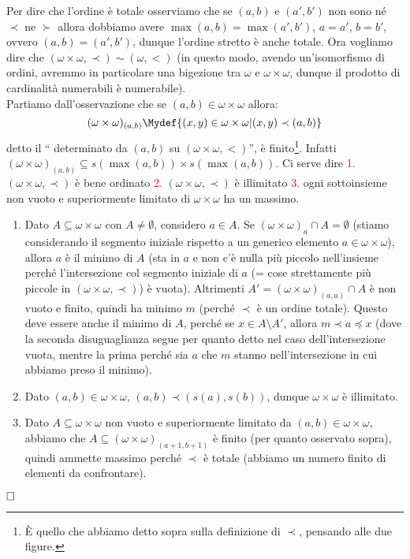 \documentclass[11pt]{scrartcl}
\begin{document}
	Per dire che l'ordine è totale osserviamo che se $(a,b)$ e $(a',b')$ non sono né $\prec$ ne $\succ$ allora dobbiamo avere $\max(a,b) = \max(a',b')$, $a = a'$, $b = b'$, ovvero $(a,b) = (a',b')$, dunque l'ordine stretto è anche totale.
	Ora vogliamo dire che $(\omega \times \omega, \prec) \sim (\omega, <)$ (in questo modo, avendo un'isomorfismo di ordini, avremmo in particolare una bigezione tra $\omega$ e $\omega \times \omega$, dunque il prodotto di cardinalità numerabili è numerabile).\\
	Partiamo dall'osservazione che se $(a,b) \in \omega \times \omega$ allora:
	\[ (\omega \times \omega)_{(a,b)} \Mydef \{(x,y) \in \omega \times \omega | (x,y) \prec (a,b)\}
		\]
	detto il `` determinato da $(a,b)$ su $(\omega \times \omega,<)$'', è finito\footnote{È quello che abbiamo detto sopra sulla definizione di $\prec$, pensando alle due figure.}. Infatti $(\omega \times \omega)_{(a,b)} \subseteq s(\max(a,b)) \times s(\max(a,b))$.
	Ci serve dire \textcolor{red}{1.} $(\omega \times \omega, \prec)$ è bene ordinato \textcolor{red}{2.} $(\omega \times \omega, \prec)$ è illimitato \textcolor{red}{3.} ogni sottoinsieme non vuoto e superiormente limitato di $\omega \times \omega$ ha un massimo.
	\begin{enumerate}[1.]
		\item Dato $A \subseteq \omega \times \omega$ con $A \ne \emptyset$, considero $a \in A$. Se $(\omega \times \omega)_a \cap A = \emptyset$ (stiamo considerando il segmento iniziale rispetto a un generico elemento $a\in\omega \times \omega$), allora $a$ è il minimo di $A$ (sta in $a$ e
		non c'è nulla più piccolo nell'insieme perché l'intersezione col segmento iniziale di $a$ (= cose strettamente più piccole in $(\omega \times \omega,\prec)$) è vuota). Altrimenti $A' = (\omega \times \omega)_{(a,a)} \cap A$ è non vuoto e finito,
		quindi ha minimo $m$ (perché $\prec$ è un ordine totale). Questo deve essere anche il minimo di $A$, perché se $x \in A \setminus A'$, allora $m \prec a \preceq x$ (dove la seconda disuguaglianza segue per quanto detto nel caso dell'intersezione vuota, mentre la prima perché sia $a$ che $m$ stanno nell'intersezione in cui abbiamo preso il minimo).
		\item Dato $(a,b) \in \omega \times \omega$, $(a,b) \prec (s(a),s(b))$, dunque $\omega \times \omega$ è illimitato.
		\item Dato $A \subseteq \omega \times \omega$ non vuoto e superiormente limitato da $(a,b) \in \omega \times \omega$, abbiamo che $A \subseteq (\omega \times \omega)_{(a+1,b+1)}$ è finito (per quanto osservato sopra), quindi ammette massimo perché $\prec$ è totale (abbiamo un numero finito di elementi da confrontare).
	\end{enumerate}
$\hfill\square$
\end{document}

